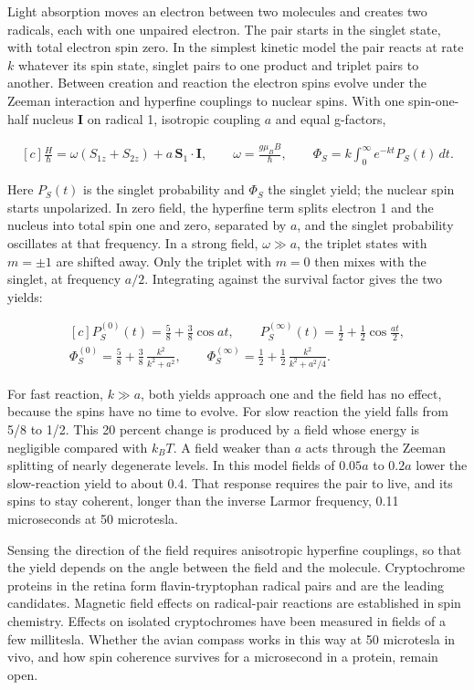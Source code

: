 \documentclass[11pt,oneside]{book}
\newenvironment{centeredalign}{\[\begin{gathered}[c]}{\end{gathered}\]}
\begin{document}
Light absorption moves an electron between two molecules and creates two radicals, each with one unpaired electron. The pair starts in the singlet state, with total electron spin zero. In the simplest kinetic model the pair reacts at rate \(k\) whatever its spin state, singlet pairs to one product and triplet pairs to another. Between creation and reaction the electron spins evolve under the Zeeman interaction and hyperfine couplings to nuclear spins. With one spin-one-half nucleus \(\mathbf I\) on radical 1, isotropic coupling \(a\) and equal g-factors,

\begin{centeredalign}
\frac{H}{\hbar}=\omega(S_{1z}+S_{2z})+a\,\mathbf S_1\cdot\mathbf I,\qquad \omega=\frac{g\mu_BB}{\hbar},
\qquad \Phi_S=k\int_0^\infty e^{-kt}P_S(t)\,dt.
\end{centeredalign}

Here \(P_S(t)\) is the singlet probability and \(\Phi_S\) the singlet yield; the nuclear spin starts unpolarized. In zero field, the hyperfine term splits electron 1 and the nucleus into total spin one and zero, separated by \(a\), and the singlet probability oscillates at that frequency. In a strong field, \(\omega\gg a\), the triplet states with \(m=\pm1\) are shifted away. Only the triplet with \(m=0\) then mixes with the singlet, at frequency \(a/2\). Integrating against the survival factor gives the two yields:

\begin{centeredalign}
P_S^{(0)}(t)=\tfrac58+\tfrac38\cos at,\qquad P_S^{(\infty)}(t)=\tfrac12+\tfrac12\cos\tfrac{at}{2},\\
\Phi_S^{(0)}=\tfrac58+\tfrac38\,\frac{k^2}{k^2+a^2},\qquad
\Phi_S^{(\infty)}=\tfrac12+\tfrac12\,\frac{k^2}{k^2+a^2/4}.
\end{centeredalign}

For fast reaction, \(k\gg a\), both yields approach one and the field has no effect, because the spins have no time to evolve. For slow reaction the yield falls from 5/8 to 1/2. This 20 percent change is produced by a field whose energy is negligible compared with \(k_BT\). A field weaker than \(a\) acts through the Zeeman splitting of nearly degenerate levels. In this model fields of \(0.05a\) to \(0.2a\) lower the slow-reaction yield to about 0.4. That response requires the pair to live, and its spins to stay coherent, longer than the inverse Larmor frequency, 0.11 microseconds at 50 microtesla.

Sensing the direction of the field requires anisotropic hyperfine couplings, so that the yield depends on the angle between the field and the molecule. Cryptochrome proteins in the retina form flavin-tryptophan radical pairs and are the leading candidates. Magnetic field effects on radical-pair reactions are established in spin chemistry. Effects on isolated cryptochromes have been measured in fields of a few millitesla. Whether the avian compass works in this way at 50 microtesla in vivo, and how spin coherence survives for a microsecond in a protein, remain open.
\end{document}
